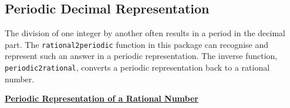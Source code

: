 \subsection{Periodic Decimal Representation}
\label{sec:rataprx}

The division of one integer by another often results in
a period in the decimal part. The \texttt{rational2periodic}
function in this package can recognise and represent
such an answer in a periodic representation. The inverse
function, \texttt{periodic2rational}, converts a
periodic representation back to a rational number.

\hypertarget{operator:RATIONAL2PERIODIC}{}
\hypertarget{operator:PERIODIC2RATIONAL}{}
\hypertarget{operator:PERIODIC}{}
\textbf{\underline{Periodic Representation of a Rational Number}}

